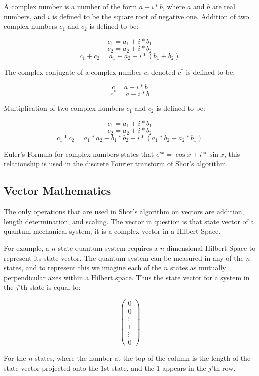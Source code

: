 \documentclass[]{article}
\begin{document}
	A complex number is a number of the form $a + i*b$, where $a$ and
$b$ are real numbers, and $i$ is defined to be the square root of negative
one.
	Addition of two complex numbers $c_{1}$ and $c_{2}$ is defined to be:

	\[c_{1} = a_{1} + i * b_{1}\] 
	\[c_{2} = a_{2} + i * b_{2}\] 
	\[c_{1} + c_{2} = a_{1} + a_{2} + i * (b_{1} + b_{2})\]

	The complex conjugate of a complex number $c$, denoted $c^{*}$ is
defined to be:

	\[c = a + i * b\] 
	\[c^{*} = a - i * b\]

	Multiplication of two complex numbers $c_{1}$ and $c_{2}$ is
defined to be:

	\[c_{1} = a_{1} + i * b_{1}\]
	\[c_{2} = a_{2} + i * b_{2}\]
	\[c_{1}*c_{2}=a_{1}*a_{2}-b_{1}*b_{2}+i*(a_{1}*b_{2}+a_{2}*b_{1})\]

	Euler's Formula for complex numbers states that $e^{ix} = \cos x +
i * \sin x$, this relationship is used in the discrete Fourier transform
of Shor's algorithm.

\subsection{Vector Mathematics}

	The only operations that are used in Shor's algorithm on
vectors are addition, length determination, and scaling.  The vector
in question is that state vector of a quantum mechanical system, it is
a complex vector in a Hilbert Space. 

	For example, a $n$ state quantum system requires a $n$ dimensional
Hilbert Space to represent its state vector.  The quantum system can
be measured in any of the $n$ states, and to represent this we imagine
each of the $n$ states as mutually perpendicular axes within a Hilbert
space.  Thus the state vector for a system in the $j$'th state is equal
to:

\[\left( \begin{array}{c} 
	0 \\ 
	0 \\ 
	\vdots \\ 
	1 \\ 
	\vdots \\ 
	0 
	\end{array} 
\right)\]

	For the $n$ states, where the number at the top of the column
is the length of the state vector projected onto the 1st state, and
the 1 appears in the $j$'th row.
\end{document}
